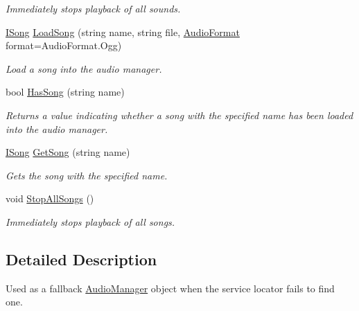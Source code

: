 \begin{DoxyCompactItemize}
\begin{DoxyCompactList}\small\item\em Immediately stops playback of all sounds. \end{DoxyCompactList}\item 
\hyperlink{interface_tri_devs_1_1_tri_engine_1_1_audio_1_1_i_song}{I\-Song} \hyperlink{class_tri_devs_1_1_tri_engine_1_1_audio_1_1_null_audio_manager_abbcc85592060f0de8dd68ee20b65387b}{Load\-Song} (string name, string file, \hyperlink{namespace_tri_devs_1_1_tri_engine_1_1_audio_a3e1817498a8306afd084903a967537ef}{Audio\-Format} format=Audio\-Format.\-Ogg)
\begin{DoxyCompactList}\small\item\em Load a song into the audio manager. \end{DoxyCompactList}\item 
bool \hyperlink{class_tri_devs_1_1_tri_engine_1_1_audio_1_1_null_audio_manager_a0f309e532ea8636369d18741ee3e2098}{Has\-Song} (string name)
\begin{DoxyCompactList}\small\item\em Returns a value indicating whether a song with the specified name has been loaded into the audio manager. \end{DoxyCompactList}\item 
\hyperlink{interface_tri_devs_1_1_tri_engine_1_1_audio_1_1_i_song}{I\-Song} \hyperlink{class_tri_devs_1_1_tri_engine_1_1_audio_1_1_null_audio_manager_ae29b1afc5fbb4037b0db6cabf47d5352}{Get\-Song} (string name)
\begin{DoxyCompactList}\small\item\em Gets the song with the specified name. \end{DoxyCompactList}\item 
void \hyperlink{class_tri_devs_1_1_tri_engine_1_1_audio_1_1_null_audio_manager_aa08c79c6f8d66bff60dbd3d53f6283a0}{Stop\-All\-Songs} ()
\begin{DoxyCompactList}\small\item\em Immediately stops playback of all songs. \end{DoxyCompactList}\end{DoxyCompactItemize}


\subsection{Detailed Description}
Used as a fallback \hyperlink{class_tri_devs_1_1_tri_engine_1_1_audio_1_1_audio_manager}{Audio\-Manager} object when the service locator fails to find one. 



